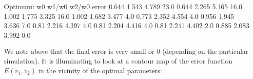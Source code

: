\documentclass[letterpaper,10pt,english]{jupyterBook}
\begin{document}
\begin{sphinxVerbatim}[commandchars=\\\{\}]
                           
\end{sphinxVerbatim}

\begin{sphinxVerbatim}[commandchars=\\\{\}]
Optimum:
   w0  w1/w0  w2/w0 error
\PYGZhy{}0.644 1.543 \PYGZhy{}4.789 23.0
\PYGZhy{}0.644 2.265 \PYGZhy{}5.165 16.0
\PYGZhy{}1.002 1.775 \PYGZhy{}3.325 16.0
\PYGZhy{}1.002 1.682 \PYGZhy{}3.477 4.0
\PYGZhy{}0.773 2.352 \PYGZhy{}4.554 4.0
\PYGZhy{}0.956 1.945 \PYGZhy{}3.636 7.0
\PYGZhy{}0.81 2.216 \PYGZhy{}4.397 4.0
\PYGZhy{}0.81 2.204 \PYGZhy{}4.416 4.0
\PYGZhy{}0.81 2.241 \PYGZhy{}4.402 2.0
\PYGZhy{}0.885 2.083 \PYGZhy{}3.992 0.0
\end{sphinxVerbatim}

\sphinxAtStartPar
We note above that the final error is very small or 0 (depending on the particular simulation). It is illuminating to look at a contour map of the error function \(E(v_1, v_2)\) in the vicinity of the optimal parameters:
\end{document}
